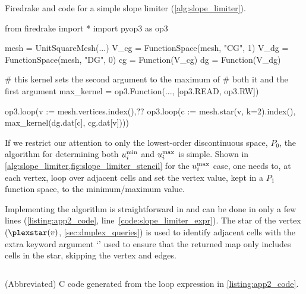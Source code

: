 \documentclass[thesis]{subfiles}
\begin{document}
\begin{listing}
  \centering
  \caption{
    Firedrake and  code for a simple slope limiter (\cref{alg:slope_limiter}).
  }
  \begin{minipage}{.9\textwidth}
    \begin{pyalg2}
      from firedrake import *
      import pyop3 as op3

      mesh = UnitSquareMesh(...)
      V_cg = FunctionSpace(mesh, "CG", 1)
      V_dg = FunctionSpace(mesh, "DG", 0)
      cg = Function(V_cg)
      dg = Function(V_dg)

      # this kernel sets the second argument to the maximum of
      # both it and the first argument
      max_kernel = op3.Function(..., [op3.READ, op3.RW])

      op3.loop(v := mesh.vertices.index(),?\label{code:slope_limiter_expr}?
               op3.loop(c := mesh.star(v, k=2).index(),
                        max_kernel(dg.dat[c], cg.dat[v])))
    \end{pyalg2}
  \end{minipage}
  \label{listing:app2_code}
\end{listing}

If we restrict our attention to only the lowest-order discontinuous space, $P_0$, the algorithm for determining both $u_i^{\textnormal{min}}$ and $u_i^{\textnormal{max}}$ is simple.
Shown in \cref{alg:slope_limiter,fig:slope_limiter_stencil} for the $u_i^{\textnormal{max}}$ case, one needs to, at each vertex, loop over adjacent cells and set the vertex value, kept in a $P_1$ function space, to the minimum/maximum value.

Implementing the algorithm is straightforward in  and can be done in only a few lines (\cref{listing:app2_code}, line~\ref{code:slope_limiter_expr}).
The star of the vertex ($\plexstar(v)$, \cref{sec:dmplex_queries}) is used to identify adjacent cells with the extra keyword argument `' used to ensure that the returned map only includes cells in the star, skipping the vertex and edges.

\begin{listing}
  \centering
  \begin{minipage}{.9\textwidth}
    \inputminted[linenos,escapeinside=??]{c}{./experiments/slope_limiter/c_code_tidy.c}
  \end{minipage}
  \caption{(Abbreviated) C code generated from the loop expression in \cref{listing:app2_code}.}
  \label{listing:app2_codegen}
\end{listing}
\end{document}
